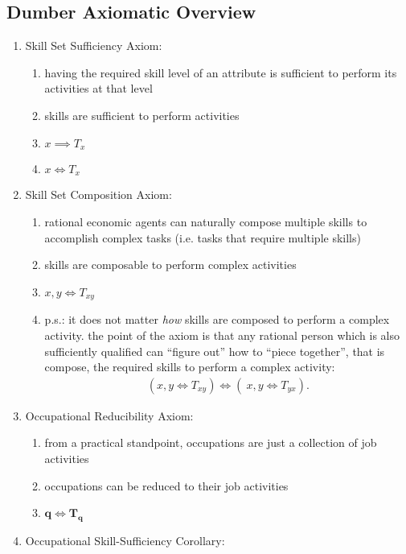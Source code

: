 \documentclass{elsarticle} %
\begin{document}
\subsection{Dumber Axiomatic Overview}
\begin{enumerate}
    \item Skill Set Sufficiency Axiom:
        \begin{enumerate}
            \item having the required skill level of an attribute is sufficient to perform its activities at that level
            \item skills are sufficient to perform activities
            \item $x \implies T_x$
            \item $x \iff T_x$
        \end{enumerate}
    \item Skill Set Composition Axiom:
        \begin{enumerate}
            \item rational economic agents can naturally compose multiple skills to accomplish complex tasks (i.e. tasks that require multiple skills)
            \item skills are composable to perform complex activities
            \item $x,y \iff T_{xy}$
            \item p.s.: it does not matter \textit{how} skills are composed to perform a complex activity. the point of the axiom is that any rational person which is also sufficiently qualified can ``figure out'' how to ``piece together'', that is compose, the required skills to perform a complex activity:
            \begin{gather*}
                (x,y \iff T_{xy}) \iff (\ x,y \iff T_{yx})
                .
            \end{gather*} 
        \end{enumerate}
    \item Occupational Reducibility Axiom:
        \begin{enumerate}
            \item from a practical standpoint, occupations are just a collection of job activities
            \item occupations can be reduced to their job activities
            \item $\boldsymbol{q} \iff \boldsymbol{T_q}$
        \end{enumerate}
    \item Occupational Skill-Sufficiency Corollary:

\end{enumerate}
\end{document}
